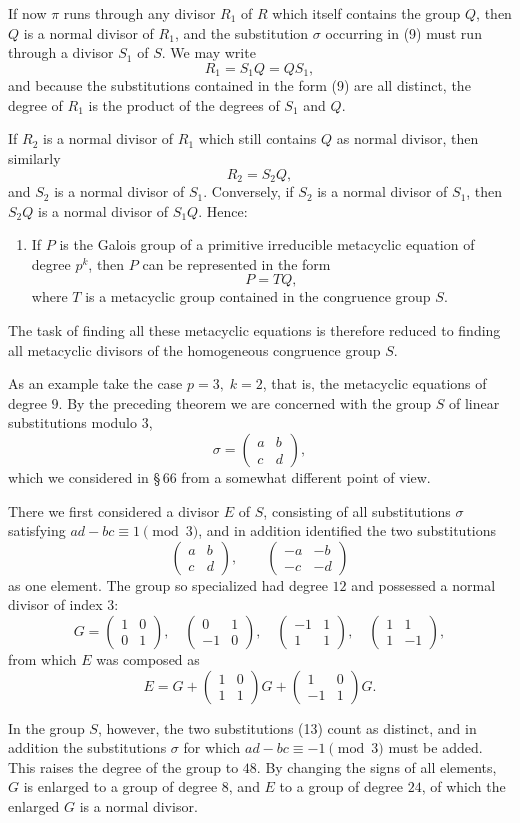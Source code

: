 \documentclass[11pt]{article}
\providecommand{\mat}[4]{\begin{pmatrix}#1&#2\\#3&#4\end{pmatrix}}
\providecommand{\mat}[4]{\begin{pmatrix}#1&#2\\#3&#4\end{pmatrix}}
\providecommand{\mat}[1]{\begin{pmatrix}#1\end{pmatrix}}
\begin{document}
If now $\pi$ runs through any divisor $R_1$ of $R$ which itself contains the group $Q$, then $Q$ is a normal divisor of $R_1$, and the substitution $\sigma$ occurring in (9) must run through a divisor $S_1$ of $S$. We may write
\[
 R_1=S_1Q=QS_1,
\]
and because the substitutions contained in the form (9) are all distinct, the degree of $R_1$ is the product of the degrees of $S_1$ and $Q$.

If $R_2$ is a normal divisor of $R_1$ which still contains $Q$ as normal divisor, then similarly
\[
 R_2=S_2Q,
\]
and $S_2$ is a normal divisor of $S_1$. Conversely, if $S_2$ is a normal divisor of $S_1$, then $S_2Q$ is a normal divisor of $S_1Q$. Hence:

\begin{enumerate}[label=\Roman*.,leftmargin=2.8em,start=2]
\item If $P$ is the Galois group of a primitive irreducible metacyclic equation of degree $p^k$, then $P$ can be represented in the form
\[
 P=TQ,
\]
where $T$ is a metacyclic group contained in the congruence group $S$.
\end{enumerate}

The task of finding all these metacyclic equations is therefore reduced to finding all metacyclic divisors of the homogeneous congruence group $S$.

As an example take the case $p=3,\;k=2$, that is, the metacyclic equations of degree $9$. By the preceding theorem we are concerned with the group $S$ of linear substitutions modulo $3$,
\begin{equation}
 \sigma=\mat{a}{b}{c}{d},
 \tag{12}
\end{equation}
which we considered in \S\,66 from a somewhat different point of view.

There we first considered a divisor $E$ of $S$, consisting of all substitutions $\sigma$ satisfying $ad-bc\equiv1\pmod 3$, and in addition identified the two substitutions
\begin{equation}
 \mat{a}{b}{c}{d},\qquad
 \mat{-a}{-b}{-c}{-d}
 \tag{13}
\end{equation}
as one element. The group so specialized had degree $12$ and possessed a normal divisor of index $3$:
\[
 G=
 \mat{1}{0}{0}{1},\quad
 \mat{0}{1}{-1}{0},\quad
 \mat{-1}{1}{1}{1},\quad
 \mat{1}{1}{1}{-1},
\]
from which $E$ was composed as
\[
 E=G+\mat{1}{0}{1}{1}G+\mat{1}{0}{-1}{1}G .
\]

In the group $S$, however, the two substitutions (13) count as distinct, and in addition the substitutions $\sigma$ for which $ad-bc\equiv -1\pmod 3$ must be added. This raises the degree of the group to $48$. By changing the signs of all elements, $G$ is enlarged to a group of degree $8$, and $E$ to a group of degree $24$, of which the enlarged $G$ is a normal divisor.
\end{document}
